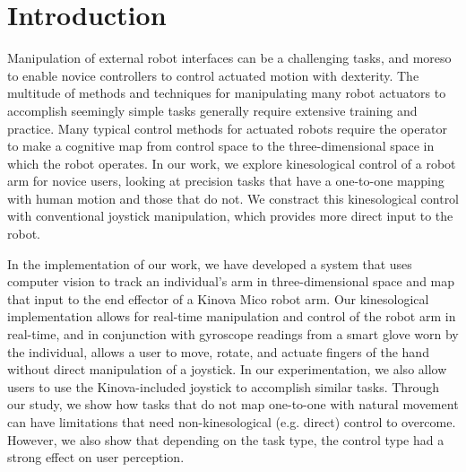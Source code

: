 \documentclass{sigchi}
\begin{document}


\section{Introduction}

Manipulation of external robot interfaces can be a challenging tasks, and moreso to enable novice controllers to control actuated motion with dexterity.  The multitude of methods and techniques for manipulating many robot actuators to accomplish seemingly simple tasks generally require extensive training and practice.  Many typical control methods for actuated robots require the operator to make a cognitive map from control space to the three-dimensional space in which the robot operates.  In our work, we explore kinesological control of a robot arm for novice users, looking at precision tasks that have a one-to-one mapping with human motion and those that do not.  We constract this kinesological control with conventional joystick manipulation, which provides more direct input to the robot.  

In the implementation of our work, we have developed a system that uses computer vision to track an individual's arm in three-dimensional space and map that input to the end effector of a Kinova Mico robot arm.  Our kinesological implementation allows for real-time manipulation and control of the robot arm in real-time, and in conjunction with gyroscope readings from a smart glove worn by the individual, allows a user to move, rotate, and actuate fingers of the hand without direct manipulation of a joystick. In our experimentation, we also allow users to use the Kinova-included joystick to accomplish similar tasks. Through our study, we show how tasks that do not map one-to-one with natural movement can have limitations that need non-kinesological (e.g. direct) control to overcome.  However, we also show that depending on the task type, the control type had a strong effect on user perception.
\end{document}
